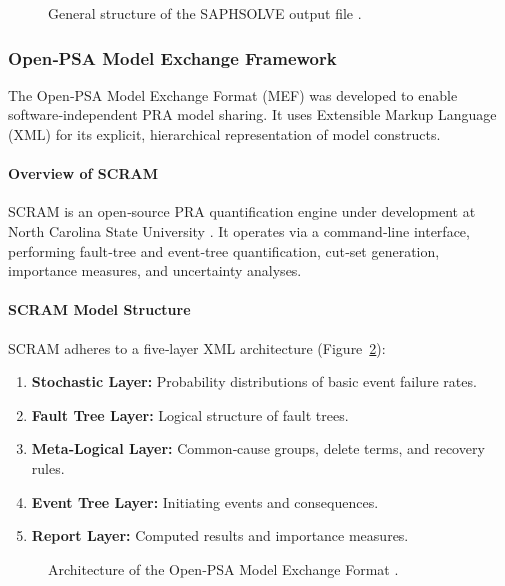 \begin{figure}[htbp]
  \centering
  \caption{General structure of the SAPHSOLVE output file \cite{15}.}
  \label{fig:saphsolve_output}
\end{figure}

\subsubsection{Open‑PSA Model Exchange Framework}
\label{sec:openpsa_mef}

The Open‑PSA Model Exchange Format (MEF) \cite{36} was developed to enable software‑independent PRA model sharing. It uses Extensible Markup Language (XML) for its explicit, hierarchical representation of model constructs.

\paragraph{Overview of SCRAM}
SCRAM is an open‑source PRA quantification engine under development at North Carolina State University \cite{39}. It operates via a command‑line interface, performing fault‑tree and event‑tree quantification, cut‑set generation, importance measures, and uncertainty analyses.

\paragraph{SCRAM Model Structure}
SCRAM adheres to a five‑layer XML architecture (Figure~\ref{fig:openpsa_arch}):
\begin{enumerate}
  \item \textbf{Stochastic Layer:} Probability distributions of basic event failure rates.
  \item \textbf{Fault Tree Layer:} Logical structure of fault trees.
  \item \textbf{Meta‑Logical Layer:} Common‑cause groups, delete terms, and recovery rules.
  \item \textbf{Event Tree Layer:} Initiating events and consequences.
  \item \textbf{Report Layer:} Computed results and importance measures.
\end{enumerate}

\begin{figure}[htbp]
  \centering
  \caption{Architecture of the Open‑PSA Model Exchange Format \cite{36}.}
  \label{fig:openpsa_arch}
\end{figure}